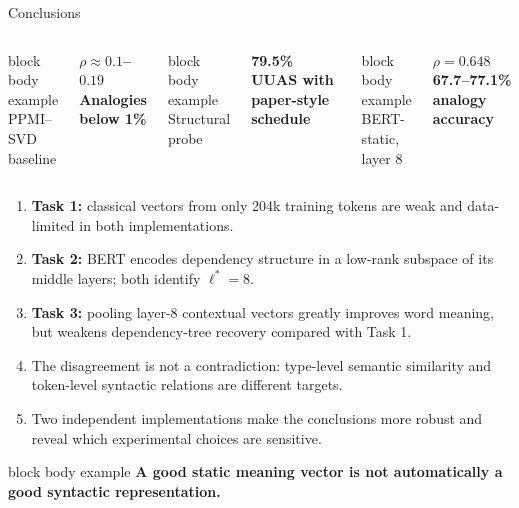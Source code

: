 \documentclass[aspectratio=169,9pt,t]{beamer}
\newcommand{\metric}[2]{\begin{beamercolorbox}[rounded=true,sep=0.7ex,wd=\linewidth]{block body example}\centering{\Large\bfseries\color{Teal}#1}\\[-0.2ex]{\scriptsize\color{Muted}#2}\end{beamercolorbox}}
\newcommand{\tightitem}{\setlength{\itemsep}{0.12em}\setlength{\parskip}{0pt}\setlength{\topsep}{0.08em}}
\newcommand{\lstar}{\ensuremath{\ell^*}}
\begin{document}
\begin{frame}{Conclusions}
\begin{columns}[T,onlytextwidth]
\metric{T1}{PPMI--SVD baseline}\vspace{0.12em}\centering\Large\bfseries\color{Navy}$\rho\approx0.1$--$0.19$\\[-1pt]{\scriptsize Analogies below 1\%}
\metric{T2}{Structural probe}\vspace{0.12em}\centering\Large\bfseries\color{Navy}79.5\%\\[-1pt]{\scriptsize UUAS with paper-style schedule}
\metric{T3}{BERT-static, layer 8}\vspace{0.12em}\centering\Large\bfseries\color{Navy}$\rho=0.648$\\[-1pt]{\scriptsize 67.7--77.1\% analogy accuracy}
\end{columns}
\vspace{0.25em}
\begin{enumerate}\tightitem
\item \textbf{Task 1:} classical vectors from only 204k training tokens are weak and data-limited in both implementations.
\item \textbf{Task 2:} BERT encodes dependency structure in a low-rank subspace of its middle layers; both identify $\lstar=8$.
\item \textbf{Task 3:} pooling layer-8 contextual vectors greatly improves word meaning, but weakens dependency-tree recovery compared with Task 1.
\item The disagreement is not a contradiction: type-level semantic similarity and token-level syntactic relations are different targets.
\item Two independent implementations make the conclusions more robust and reveal which experimental choices are sensitive.
\end{enumerate}
\vspace{0.3em}
\begin{beamercolorbox}[rounded=true,sep=1.05ex,wd=\linewidth]{block body example}
\centering\large\bfseries\color{Navy}A good static meaning vector is not automatically a good syntactic representation.
\end{beamercolorbox}
\end{frame}
\end{document}
